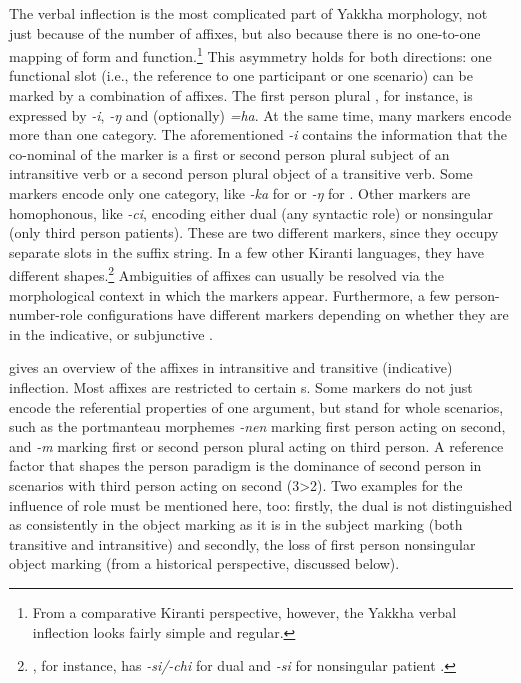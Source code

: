 The verbal inflection is the most complicated part of Yakkha morphology, not just because of the number of affixes, but also because there is no one-to-one mapping of form and function.\footnote{From a comparative Kiranti perspective, however, the Yakkha verbal inflection looks fairly simple and regular.} This asymmetry holds for both directions: one functional slot (i.e., the reference to one participant or one scenario) can be marked by a combination of affixes. The first person plural , for instance, is expressed by \emph{-i}, \emph{-ŋ} and (optionally) \emph{=ha}. At the same time, many markers  encode more than one category. The aforementioned \emph{-i} contains the information that the co-nominal of the marker is a first or second person plural subject of an intransitive verb or a second person plural object of a transitive verb.  Some markers encode only one category, like \emph{-ka} for  or \emph{-ŋ} for . Other markers are homophonous, like \emph{-ci}, encoding either dual (any syntactic role) or nonsingular (only third person patients). These are two different markers, since they occupy separate slots in the suffix string. In a few other Kiranti languages, they have different shapes.\footnote{, for instance, has \emph{-si/-chi} for dual and \emph{-si} for nonsingular patient \citep[75]{Driem1987A-grammar}.} Ambiguities of affixes can  usually be resolved via the morphological context in which the markers appear. Furthermore,  a few person-number-role configurations have different markers depending on whether they are in the indicative,  or subjunctive . 


 gives an overview of the  affixes in intransitive and transitive (indicative) inflection. Most affixes are restricted to certain s. Some markers do not just encode the referential properties  of one argument, but stand for whole scenarios, such as the portmanteau morphemes \emph{-nen} marking first person acting on second, and \emph{-m} marking first or second person plural acting on third person. A reference factor that shapes the person paradigm is the dominance of second person in scenarios with third person acting on second (3>2). Two examples for the influence of role must be mentioned here, too: firstly, the dual is not distinguished as consistently in the object marking as it is in the subject marking (both transitive and intransitive) and secondly, the loss of first person nonsingular object marking (from a historical perspective, discussed below). 


